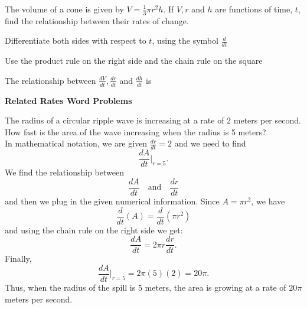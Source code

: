 \documentclass{ximera}
\begin{document}
\begin{question}
The volume of a cone is given by $V = \frac13 \pi r^2h$. If $V, r$ and $h$ are functions of time, $t$,
find the relationship between their rates of change.\\
\begin{hint}
Differentiate both sides with respect to $t$, using the symbol $\frac{d}{dt}$
\end{hint}
\begin{hint}
Use the product rule on the right side and the chain rule on the square
\end{hint}

The relationship between $\frac{dV}{dt}, \frac{dr}{dt}$ and $\frac{dh}{dt}$ is
\begin{multipleChoice}
\end{multipleChoice}
\end{question}






\begin{center}
\bf{Related Rates Word Problems}
\end{center}



\begin{example}
The radius of a circular ripple wave is increasing at a rate of 2 meters per second. How fast is the area of the wave 
increasing when the radius is 5 meters? \\
In mathematical notation, we are given $\frac{dr}{dt} = 2$ and we need to find
\[\frac{dA}{dt}\bigg|_{r = 5}.\]
We find the relationship between 
\[\frac{dA}{dt} \quad \text{and} \quad \frac{dr}{dt}\]
and then we plug in the given numerical information.
Since $A = \pi r^2$, we have
\[\frac{d}{dt} (A) = \frac{d}{dt}(\pi r^2)  \]
and using the chain rule on the right side we get:
\[\frac{dA}{dt}  = 2\pi r \frac{dr}{dt}.\]
Finally,
\[\frac{dA}{dt}\bigg|_{r = 5}  = 2\pi (5) (2) = 20\pi.\]
Thus, when the radius of the spill is 5 meters, the area is growing at a rate of $20\pi$ meters per second.
\end{example}
\end{document}
